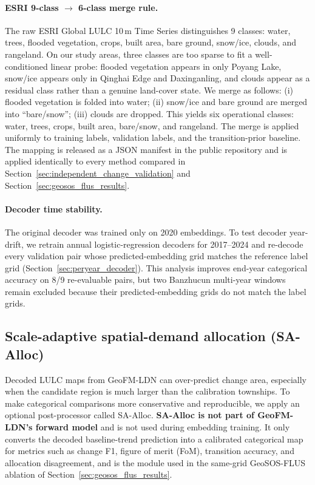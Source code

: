 \documentclass{article}
\begin{document}
\paragraph{ESRI 9-class $\to$ 6-class merge rule.} The raw ESRI Global LULC 10\,m Time Series distinguishes 9 classes: water, trees, flooded vegetation, crops, built area, bare ground, snow/ice, clouds, and rangeland. On our study areas, three classes are too sparse to fit a well-conditioned linear probe: flooded vegetation appears in only Poyang Lake, snow/ice appears only in Qinghai Edge and Daxinganling, and clouds appear as a residual class rather than a genuine land-cover state. We merge as follows: (i) flooded vegetation is folded into water; (ii) snow/ice and bare ground are merged into ``bare/snow''; (iii) clouds are dropped. This yields six operational classes: water, trees, crops, built area, bare/snow, and rangeland. The merge is applied uniformly to training labels, validation labels, and the transition-prior baseline. The mapping is released as a JSON manifest in the public repository and is applied identically to every method compared in Section~\ref{sec:independent_change_validation} and Section~\ref{sec:geosos_flus_results}.

\paragraph{Decoder time stability.} The original decoder was trained only on 2020 embeddings. To test decoder year-drift, we retrain annual logistic-regression decoders for 2017--2024 and re-decode every validation pair whose predicted-embedding grid matches the reference label grid (Section~\ref{sec:peryear_decoder}). This analysis improves end-year categorical accuracy on 8/9 re-evaluable pairs, but two Banzhucun multi-year windows remain excluded because their predicted-embedding grids do not match the label grids.

\subsection{Scale-adaptive spatial-demand allocation (SA-Alloc)}
\label{sec:scale_adaptive_allocation}

Decoded LULC maps from GeoFM-LDN can over-predict change area, especially when the candidate region is much larger than the calibration townships. To make categorical comparisons more conservative and reproducible, we apply an optional post-processor called SA-Alloc. \textbf{SA-Alloc is not part of GeoFM-LDN's forward model} and is not used during embedding training. It only converts the decoded baseline-trend prediction into a calibrated categorical map for metrics such as change F1, figure of merit (FoM), transition accuracy, and allocation disagreement, and is the module used in the same-grid GeoSOS-FLUS ablation of Section~\ref{sec:geosos_flus_results}.
\end{document}
